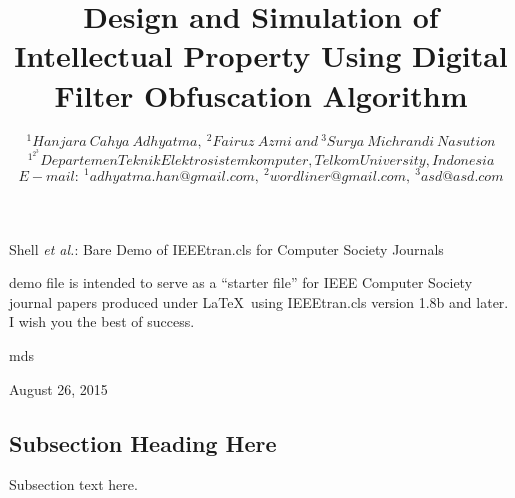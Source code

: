 \documentclass[10pt,journal,compsoc]{IEEEtran}
\begin{document}
\title{Design and Simulation of Intellectual Property Using Digital Filter Obfuscation Algorithm}

\author{
	\[ ^1Hanjara~Cahya~Adhyatma,~^2Fairuz~Azmi~and~^3Surya~Michrandi~Nasution \]
    \[^1^2^3Departemen Teknik Elektro sistem komputer, Telkom University, Indonesia\]
    \[E-mail:~^1adhyatma.han@gmail.com,~^2wordliner@gmail.com,~^3asd@asd.com\]
}

{Shell \MakeLowercase{\textit{et al.}}: Bare Demo of IEEEtran.cls for Computer Society Journals}


\maketitle




 demo file is intended to serve as a ``starter file'' for IEEE Computer Society journal papers produced under \LaTeX\ using IEEEtran.cls version 1.8b and later. I wish you the best of success.

\hfill mds
 
\hfill August 26, 2015

\subsection{Subsection Heading Here}
Subsection text here.
\end{document}
